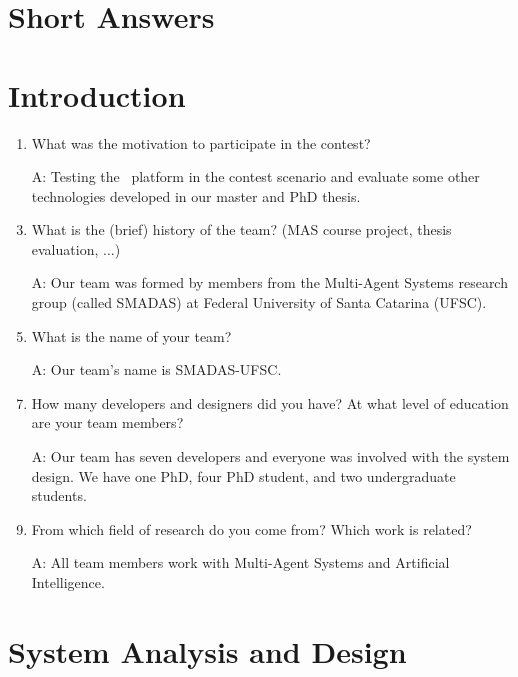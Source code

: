 \section*{Short Answers}

\appendix

\section{Introduction}

\begin{enumerate}
\item What was the motivation to participate in the contest?
	\item[A:] Testing the \jacamo\ platform in the contest scenario and evaluate some other technologies developed in our master and PhD thesis. \\

\item What is the (brief) history of the team? (MAS course project, thesis evaluation, $\ldots$)
	\item[A:] Our team was formed by members from the Multi-Agent Systems research group (called SMADAS) at Federal University of Santa Catarina (UFSC).\\
	
\item What is the name of your team?
	\item[A:] Our team's name is SMADAS-UFSC.\\

\item How many developers and designers did you have? At what level of education are your team members?
	\item[A:] Our team has seven developers and everyone was involved with the system design. We have one PhD, four PhD student, and two undergraduate students. \\
	
\item From which field of research do you come from? Which work is related?
	\item[A:] All team members work with Multi-Agent Systems and Artificial Intelligence.\\
	
\end{enumerate}

\section{System Analysis and Design}

